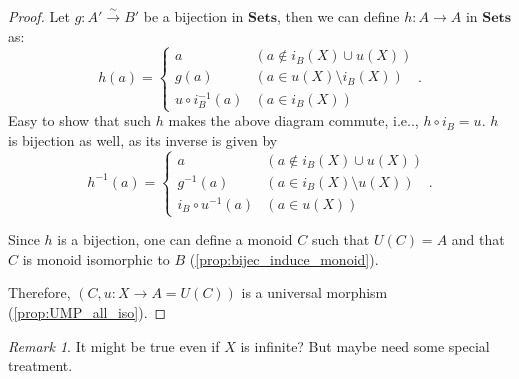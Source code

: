 \documentclass[12pt, letterpaper]{article}
\makeatletter
\newcommand\ie{i.e\@ifnextchar.{}{.\@}}
\newcommand{\red}[1]{{\color{red} #1}}
\newcommand{\define}{\coloneqq}
\theoremstyle{definition}
\theoremstyle{remark}
\newtheorem*{rem*}{Remark}
\theoremstyle{definition}
\theoremstyle{plain}
\newcommand{\iso}{{\xrightarrow{\sim}}}
\numberwithin{equation}{section}
\makeatother
\begin{document}
\begin{proof}
		Let $g\colon A'\iso B'$ be a bijection in $\mathbf{Sets}$, %
		then we can define $h\colon A\to A$  in $\mathbf{Sets}$ as:
		\[
		h(a)=\begin{cases}
			a & (a\notin i_B(X)\cup u(X))\\
			g(a) & (a\in u(X)\setminus i_B(X))\\
			u\circ i_B^{-1}(a) & (a\in  i_B(X) )
		\end{cases}.
		\]
		Easy to show that such $h$ makes the above diagram commute,
		\ie, $h\circ i_B = u$.
		$h$ is bijection as well, as its inverse is given by
		\[
		h^{-1}(a)=\begin{cases}
			a & (a\notin i_B(X)\cup u(X))\\
			g^{-1}(a) & (a\in i_B(X)\setminus u(X))\\
			i_B\circ u^{-1}(a) & (a\in  u(X) )
		\end{cases}.
		\]
		
		Since $h$ is a bijection, one can define a monoid $C$ such that $U(C)=A$
		and that $C$ is monoid isomorphic to $B$ (\ref{prop:bijec_induce_monoid}).
		
		Therefore, $(C,u\colon X\to A=U(C))$ is a universal morphism (\ref{prop:UMP_all_iso}).
	\end{proof}
	\begin{rem*}
		\red{It might be true even if $X$ is infinite? But maybe need some special treatment.}
	\end{rem*}
\end{document}

